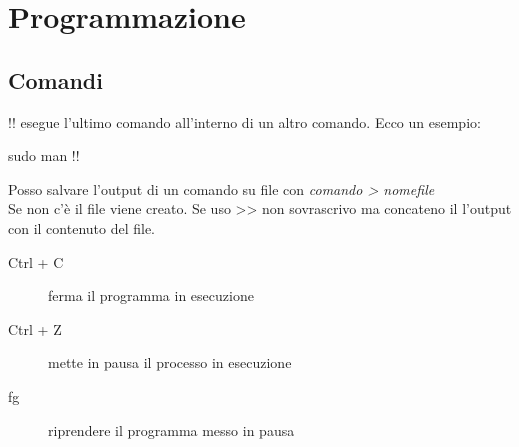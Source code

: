 \chapter{Programmazione}
\section{Comandi}
!! esegue l'ultimo comando all'interno di un altro comando. Ecco un esempio:
\begin{tcolorbox}
sudo man !!
\end{tcolorbox}
Posso salvare l'output di un comando su file con \textit{comando > nomefile}\\
Se non c'è il file viene creato. Se uso >> non sovrascrivo ma concateno il l'output con il contenuto del file.

\begin{description}
\item [Ctrl + C] ferma il programma in esecuzione
\item [Ctrl + Z] mette in pausa il processo in esecuzione 
\item [fg] riprendere il programma messo in pausa
\end{description}
